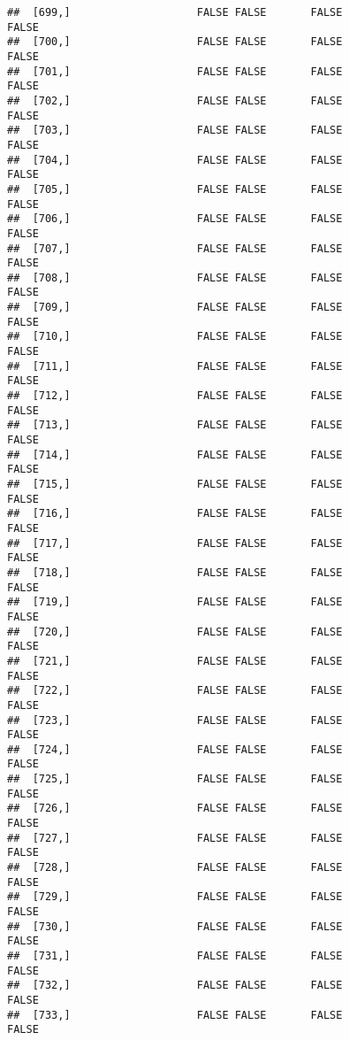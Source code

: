 \documentclass[
]{article}
\begin{document}
\begin{verbatim}
##  [699,]                    FALSE FALSE       FALSE                FALSE
##  [700,]                    FALSE FALSE       FALSE                FALSE
##  [701,]                    FALSE FALSE       FALSE                FALSE
##  [702,]                    FALSE FALSE       FALSE                FALSE
##  [703,]                    FALSE FALSE       FALSE                FALSE
##  [704,]                    FALSE FALSE       FALSE                FALSE
##  [705,]                    FALSE FALSE       FALSE                FALSE
##  [706,]                    FALSE FALSE       FALSE                FALSE
##  [707,]                    FALSE FALSE       FALSE                FALSE
##  [708,]                    FALSE FALSE       FALSE                FALSE
##  [709,]                    FALSE FALSE       FALSE                FALSE
##  [710,]                    FALSE FALSE       FALSE                FALSE
##  [711,]                    FALSE FALSE       FALSE                FALSE
##  [712,]                    FALSE FALSE       FALSE                FALSE
##  [713,]                    FALSE FALSE       FALSE                FALSE
##  [714,]                    FALSE FALSE       FALSE                FALSE
##  [715,]                    FALSE FALSE       FALSE                FALSE
##  [716,]                    FALSE FALSE       FALSE                FALSE
##  [717,]                    FALSE FALSE       FALSE                FALSE
##  [718,]                    FALSE FALSE       FALSE                FALSE
##  [719,]                    FALSE FALSE       FALSE                FALSE
##  [720,]                    FALSE FALSE       FALSE                FALSE
##  [721,]                    FALSE FALSE       FALSE                FALSE
##  [722,]                    FALSE FALSE       FALSE                FALSE
##  [723,]                    FALSE FALSE       FALSE                FALSE
##  [724,]                    FALSE FALSE       FALSE                FALSE
##  [725,]                    FALSE FALSE       FALSE                FALSE
##  [726,]                    FALSE FALSE       FALSE                FALSE
##  [727,]                    FALSE FALSE       FALSE                FALSE
##  [728,]                    FALSE FALSE       FALSE                FALSE
##  [729,]                    FALSE FALSE       FALSE                FALSE
##  [730,]                    FALSE FALSE       FALSE                FALSE
##  [731,]                    FALSE FALSE       FALSE                FALSE
##  [732,]                    FALSE FALSE       FALSE                FALSE
##  [733,]                    FALSE FALSE       FALSE                FALSE

\end{verbatim}
\end{document}
